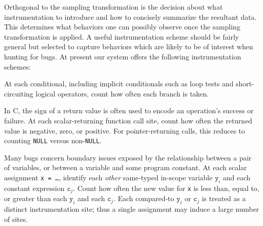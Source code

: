 \documentclass{sig-alternate}
\begin{document}
Orthogonal to the sampling transformation is the decision about what
instrumentation to introduce and how to concisely
summarize the resultant data.  This determines what behaviors one can
possibly observe once the sampling transformation is applied.  A useful instrumentation
scheme should be fairly general but selected to capture behaviors
which are likely to be of interest when hunting for bugs.  At present
our system offers the following instrumentation schemes:

\begin{description}
\sloppy
\item[branches:] At each conditional, including implicit conditionals
such as loop tests and short-circuiting logical operators,
  count how often each branch is taken.  

\item[returns:] In C, the
  sign of a return value is often used to encode an operation's success or failure.
  At each scalar-returning function call site, count how
  often the returned value is negative, zero, or positive.  For
  pointer-returning calls, this reduces to counting
  \texttt{NULL} versus non-\texttt{NULL}.  

\item[scalar-pairs:] Many bugs
  concern boundary issues exposed by the relationship between a pair
  of variables, or between a variable and some program constant.  At
  each scalar assignment \texttt{x = \dots}, identify each
  \emph{other} same-typed in-scope variable $\mathtt{y}_i$ and each
  constant expression $\mathtt{c}_j$.  Count how often the new value
  for \texttt{x} is less than, equal to, or greater than each
  $\mathtt{y}_i$ and each $\mathtt{c}_j$.  
Each compared-to $\mathtt{y}_i$
  or $\mathtt{c}_j$ is treated as a distinct instrumentation site;
  thus a single assignment may induce a large number of sites.  
\end{description}
\end{document}
